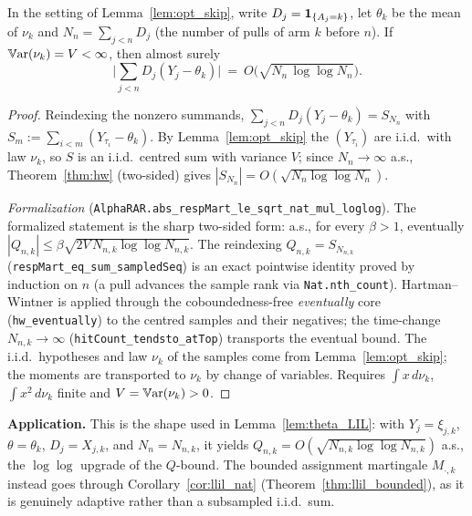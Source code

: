 \begin{corollary}\label{cor:subsampled_lil}
\leanok
{}
In the setting of Lemma~\ref{lem:opt_skip}, write $D_j=\mathbf{1}_{\{A_j=k\}}$, let $\theta_k$ be the
mean of $\nu_k$ and $N_n=\sum_{j<n}D_j$ (the number of pulls of arm $k$ before $n$). If
$\mathbb{V}\mathrm{ar}(\nu_k)=V<\infty$, then almost surely
\[
  \Big|\sum_{j<n}D_j(Y_j-\theta_k)\Big|\ =\ O\!\big(\sqrt{N_n\,\log\log N_n}\big).
\]
\end{corollary}
\begin{proof}\leanok
Reindexing the nonzero summands, $\sum_{j<n}D_j(Y_j-\theta_k)=S_{N_n}$ with
$S_m:=\sum_{i<m}(Y_{\tau_i}-\theta_k)$. By Lemma~\ref{lem:opt_skip} the $(Y_{\tau_i})$ are i.i.d.\ with
law $\nu_k$, so $S$ is an i.i.d.\ centred sum with variance $V$; since $N_n\to\infty$ a.s.,
Theorem~\ref{thm:hw} (two-sided) gives $|S_{N_n}|=O(\sqrt{N_n\log\log N_n})$.

\emph{Formalization} (\texttt{AlphaRAR.abs\_respMart\_le\_sqrt\_nat\_mul\_loglog}). The formalized
statement is the sharp two-sided form: a.s., for every $\beta>1$, eventually
$|Q_{n,k}|\le\beta\sqrt{2V\,N_{n,k}\log\log N_{n,k}}$. The reindexing $Q_{n,k}=S_{N_{n,k}}$
(\texttt{respMart\_eq\_sum\_sampledSeq}) is an exact pointwise identity proved by induction on $n$
(a pull advances the sample rank via \texttt{Nat.nth\_count}). Hartman--Wintner is applied through
the coboundedness-free \emph{eventually} core (\texttt{hw\_eventually}) to the centred samples and
their negatives; the time-change $N_{n,k}\to\infty$ (\texttt{hitCount\_tendsto\_atTop}) transports
the eventual bound. The i.i.d.\ hypotheses and law $\nu_k$ of the samples come from
Lemma~\ref{lem:opt_skip}; the moments are transported to $\nu_k$ by change of variables. Requires
$\int x\,d\nu_k$, $\int x^2\,d\nu_k$ finite and $V=\mathbb{V}\mathrm{ar}(\nu_k)>0$.
\end{proof}

\textbf{Application.} This is the shape used in Lemma~\ref{lem:theta_LIL}: with
$Y_j=\xi_{j,k}$, $\theta=\theta_k$, $D_j=X_{j,k}$, and $N_n=N_{n,k}$, it yields
$Q_{n,k}=O(\sqrt{N_{n,k}\log\log N_{n,k}})$ a.s., the $\log\log$ upgrade of the
$Q$-bound. The bounded assignment martingale $M_{\cdot,k}$ instead goes through
Corollary~\ref{cor:llil_nat} (Theorem~\ref{thm:llil_bounded}), as it is genuinely
adaptive rather than a subsampled i.i.d.\ sum.

